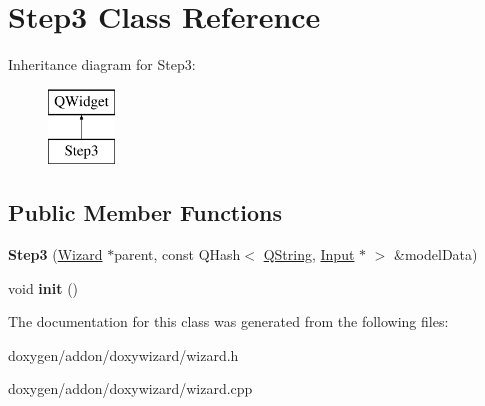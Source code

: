 \hypertarget{class_step3}{}\section{Step3 Class Reference}
\label{class_step3}
Inheritance diagram for Step3\+:\begin{figure}[H]
\begin{center}
\leavevmode
\includegraphics[height=2.000000cm]{class_step3}
\end{center}
\end{figure}
\subsection*{Public Member Functions}
\begin{DoxyCompactItemize}
\item 
\mbox{\label{class_step3_aeac8b4e168e07cd636a1fec1ccc4bd7d}} 
{\bfseries Step3} (\mbox{\hyperlink{class_wizard}{Wizard}} $\ast$parent, const Q\+Hash$<$ \mbox{\hyperlink{class_q_string}{Q\+String}}, \mbox{\hyperlink{class_input}{Input}} $\ast$ $>$ \&model\+Data)
\item 
\mbox{\label{class_step3_a50d6bc75c36b723d22a02e6c7f220198}} 
void {\bfseries init} ()
\end{DoxyCompactItemize}


The documentation for this class was generated from the following files\+:\begin{DoxyCompactItemize}
\item 
doxygen/addon/doxywizard/wizard.\+h\item 
doxygen/addon/doxywizard/wizard.\+cpp\end{DoxyCompactItemize}
